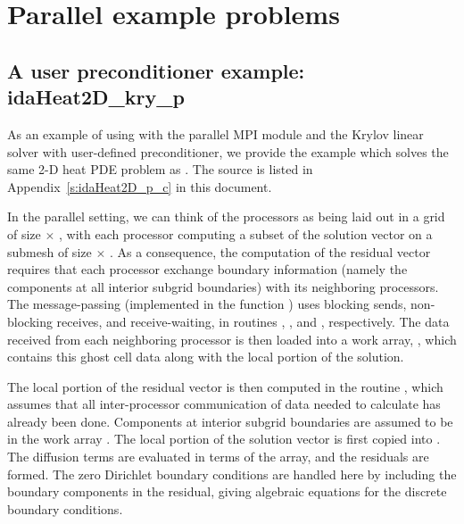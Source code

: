 \section{Parallel example problems}\label{s:ex_parallel}

\subsection{A user preconditioner example: idaHeat2D\_kry\_p}\label{ss:idaHeat2D_p}

As an example of using {\ida} with the parallel MPI {\nvecp} module and the Krylov 
linear solver {\idaspgmr} with user-defined preconditioner, we provide the example
 which solves the same 2-D heat PDE problem as . 
The source is listed in Appendix~\ref{s:idaHeat2D_p_c} in this document.

In the parallel setting, we can think of the processors as being laid out
in a grid of size  $\times$ , with each processor computing
a subset of the solution vector on a submesh of size  $\times$
.  As a consequence, the computation of the residual
vector requires that each processor exchange boundary information
(namely the components at all interior subgrid boundaries) with its
neighboring processors.  The message-passing (implemented in the
function ) uses blocking sends, non-blocking receives, and
receive-waiting, in routines , , and
, respectively.  The data received from each neighboring
processor is then loaded into a work array, , which contains
this ghost cell data along with the local portion of the solution.

The local portion of the residual vector is then computed in the
routine , which assumes that all inter-processor
communication of data needed to calculate  has already been
done.  Components at interior subgrid boundaries are assumed to be in
the work array .  The local portion of the solution vector
 is first copied into .  The diffusion terms are
evaluated in terms of the  array, and the residuals are
formed.  The zero Dirichlet boundary conditions are handled here by
including the boundary components in the residual, giving algebraic
equations for the discrete boundary conditions.

